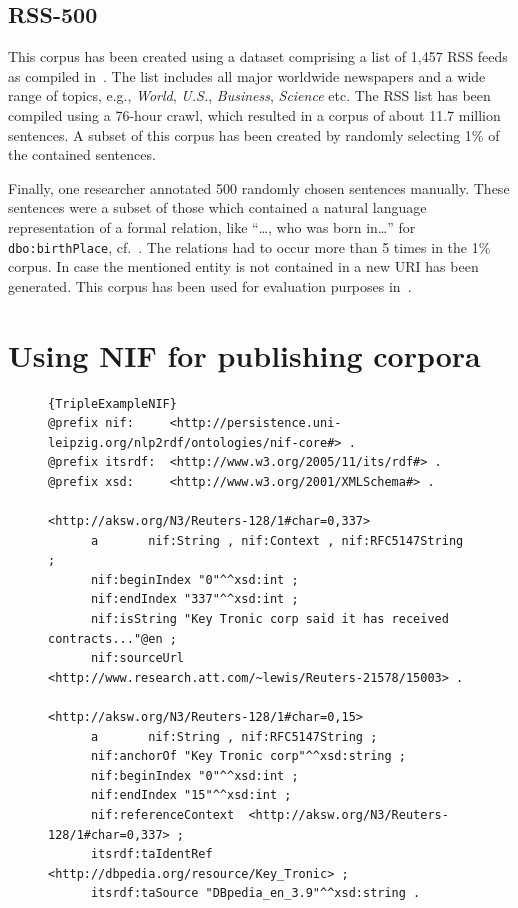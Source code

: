 \subsection{RSS-500}

This corpus has been created using a dataset comprising a list of 1,457 RSS feeds as compiled in~\cite{GOLDHAHN12.327}.
The list includes all major worldwide newspapers and a wide range of topics, e.g., \emph{World}, \emph{U.S.}, \emph{Business}, \emph{Science} etc.
The RSS list has been compiled using a 76-hour crawl, which resulted in a corpus of about 11.7 million sentences.
A subset of this corpus has been created by randomly selecting 1\% of the contained sentences.
 
Finally, one researcher annotated 500 randomly chosen sentences manually.
These sentences were a subset of those which contained a natural language representation of a formal relation, like ``\ldots, who was born in\ldots '' for \texttt{dbo:birthPlace}, cf.~\cite{conf/ekaw/GerberN12}.
The relations had to occur more than 5 times in the 1\% corpus. %
In case the mentioned entity is not contained in a new URI has been generated.
This corpus has been used for evaluation purposes in~\cite{GER+13}.

\section{Using NIF for publishing corpora}
\label{n3:NIF}



\begin{figure}[htb!]
\begin{lstlisting}[label=n3:TripleExampleNIF,caption=Example of the resulting N3-triples.]{TripleExampleNIF}
@prefix nif:     <http://persistence.uni-leipzig.org/nlp2rdf/ontologies/nif-core#> .
@prefix itsrdf:  <http://www.w3.org/2005/11/its/rdf#> .
@prefix xsd:     <http://www.w3.org/2001/XMLSchema#> .

<http://aksw.org/N3/Reuters-128/1#char=0,337>
      a       nif:String , nif:Context , nif:RFC5147String ;
      nif:beginIndex "0"^^xsd:int ;
      nif:endIndex "337"^^xsd:int ;
      nif:isString "Key Tronic corp said it has received contracts..."@en ;
      nif:sourceUrl <http://www.research.att.com/~lewis/Reuters-21578/15003> .

<http://aksw.org/N3/Reuters-128/1#char=0,15>
      a       nif:String , nif:RFC5147String ;
      nif:anchorOf "Key Tronic corp"^^xsd:string ;
      nif:beginIndex "0"^^xsd:int ;
      nif:endIndex "15"^^xsd:int ;
      nif:referenceContext  <http://aksw.org/N3/Reuters-128/1#char=0,337> ;
      itsrdf:taIdentRef <http://dbpedia.org/resource/Key_Tronic> ;
      itsrdf:taSource "DBpedia_en_3.9"^^xsd:string .
\end{lstlisting}
\end{figure}




